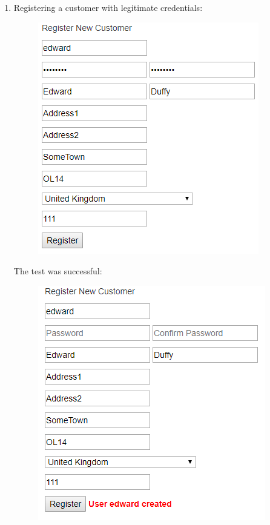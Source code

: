 ﻿\documentclass{article}
\begin{document}
    \begin{enumerate}
        \item Registering a customer with legitimate credentials:
        \begin{figure}[H]
            \includegraphics{testing/custReg1.png}
            \centering
        \end{figure}
        The test was successful:
        \begin{figure}[H]
            \includegraphics{testing/custReg2.png}
            \centering
        \end{figure}
    \end{enumerate}
    \newpage
\end{document}
